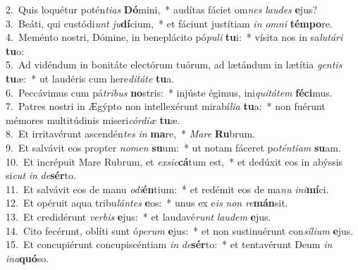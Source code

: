 {2.~}Quis loquétur potén\textit{ti}\textit{as} \textbf{Dó}mini,~* audítas fáciet om\textit{nes} \textit{lau}\textit{des} \textbf{e}jus?\\
{3.~}Beáti, qui custódi\textit{unt} \textit{ju}\textbf{dí}cium,~* et fáciunt justítiam \textit{in} \textit{om}\textit{ni} \textbf{tém}\textbf{po}re.\\
{4.~}Meménto nostri, Dómine, in beneplácito pó\textit{pu}\textit{li} \textbf{tu}i:~* vísita nos in sa\textit{lu}\textit{tá}\textit{ri} \textbf{tu}o:\\
{5.~}Ad vidéndum in bonitáte electórum tuórum, ad lætándum in lætítia \textit{gen}\textit{tis} \textbf{tu}æ:~* ut laudéris cum here\textit{di}\textit{tá}\textit{te} \textbf{tu}a.\\
{6.~}Peccávimus cum pá\textit{tri}\textit{bus} \textbf{no}stris:~* injúste égimus, ini\textit{qui}\textit{tá}\textit{tem} \textbf{fé}\textbf{ci}mus.\\
{7.~}Patres nostri in Ægýpto non intellexérunt mirabí\textit{li}\textit{a} \textbf{tu}a:~* non fuérunt mémores multitúdinis miseri\textit{cór}\textit{di}\textit{æ} \textbf{tu}æ.\\
{8.~}Et irritavérunt ascendén\textit{tes} \textit{in} \textbf{ma}re,~* \textit{Ma}\textit{re} \textbf{Ru}brum.\\
{9.~}Et salvávit eos propter \textit{no}\textit{men} \textbf{su}um:~* ut notam fáceret po\textit{tén}\textit{ti}\textit{am} \textbf{su}am.\\
{10.~}Et incrépuit Mare Rubrum, et \textit{ex}\textit{sic}\textbf{cá}tum est,~* et dedúxit eos in abýssis si\textit{cut} \textit{in} \textit{de}\textbf{sér}to.\\
{11.~}Et salvávit eos de manu \textit{o}\textit{di}\textbf{én}tium:~* et redémit eos de ma\textit{nu} \textit{i}\textit{ni}\textbf{mí}ci.\\
{12.~}Et opéruit aqua tribu\textit{lán}\textit{tes} \textbf{e}os:~* unus ex e\textit{is} \textit{non} \textit{re}\textbf{mán}sit.\\
{13.~}Et credidérunt \textit{ver}\textit{bis} \textbf{e}jus:~* et laudavé\textit{runt} \textit{lau}\textit{dem} \textbf{e}jus.\\
{14.~}Cito fecérunt, oblíti sunt ó\textit{pe}\textit{rum} \textbf{e}jus:~* et non sustinuérunt con\textit{sí}\textit{li}\textit{um} \textbf{e}jus.\\
{15.~}Et concupiérunt concupiscéntiam \textit{in} \textit{de}\textbf{sér}to:~* et tentavérunt Deum \textit{in} \textit{i}\textit{na}\textbf{quó}so.\\
